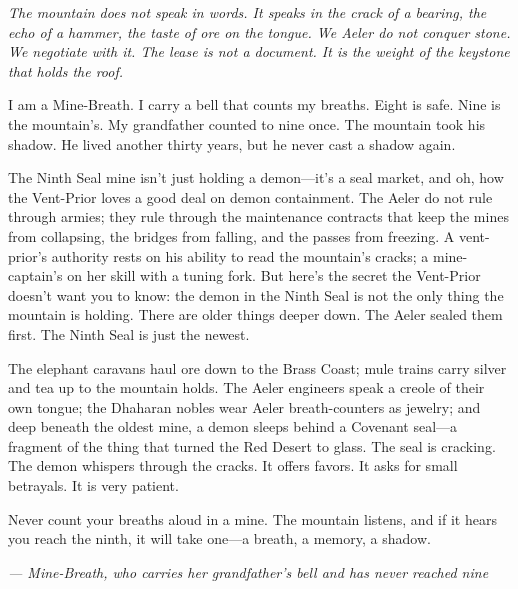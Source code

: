 \noindent
{\Large
\textit{The mountain does not speak in words. It speaks in the crack of a bearing, the echo of a hammer, the taste of ore on the tongue. We Aeler do not conquer stone. We negotiate with it. The lease is not a document. It is the weight of the keystone that holds the roof.}

\vspace{0.5em}

I am a Mine-Breath. I carry a bell that counts my breaths. Eight is safe. Nine is the mountain's. My grandfather counted to nine once. The mountain took his shadow. He lived another thirty years, but he never cast a shadow again.

\vspace{0.5em}

The Ninth Seal mine isn't just holding a demon---it's a seal market, and oh, how the Vent-Prior loves a good deal on demon containment. The Aeler do not rule through armies; they rule through the maintenance contracts that keep the mines from collapsing, the bridges from falling, and the passes from freezing. A vent-prior's authority rests on his ability to read the mountain's cracks; a mine-captain's on her skill with a tuning fork. But here's the secret the Vent-Prior doesn't want you to know: the demon in the Ninth Seal is not the only thing the mountain is holding. There are older things deeper down. The Aeler sealed them first. The Ninth Seal is just the newest.

\vspace{0.5em}

The elephant caravans haul ore down to the Brass Coast; mule trains carry silver and tea up to the mountain holds. The Aeler engineers speak a creole of their own tongue; the Dhaharan nobles wear Aeler breath-counters as jewelry; and deep beneath the oldest mine, a demon sleeps behind a Covenant seal---a fragment of the thing that turned the Red Desert to glass. The seal is cracking. The demon whispers through the cracks. It offers favors. It asks for small betrayals. It is very patient.

\vspace{0.5em}

Never count your breaths aloud in a mine. The mountain listens, and if it hears you reach the ninth, it will take one---a breath, a memory, a shadow.

\vspace{1em}

\noindent\textit{--- Mine-Breath, who carries her grandfather's bell and has never reached nine}
}


